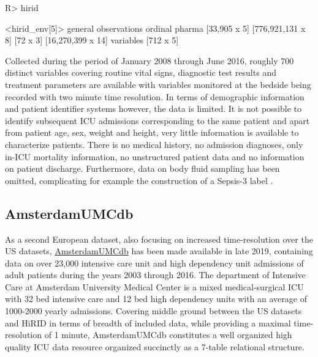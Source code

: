 \documentclass[
  notitle,
  nojss,
  noheadings]{jss}
\begin{document}
\begin{CodeChunk}
\begin{CodeInput}
R> hirid
\end{CodeInput}
\begin{CodeOutput}
<hirid_env[5]>
          general      observations           ordinal            pharma 
     [33,905 x 5] [776,921,131 x 8]          [72 x 3] [16,270,399 x 14] 
        variables 
        [712 x 5] 
\end{CodeOutput}
\end{CodeChunk}

Collected during the period of January 2008 through June 2016, roughly
700 distinct variables covering routine vital signs, diagnostic test
results and treatment parameters are available with variables monitored
at the bedside being recorded with two minute time resolution. In terms
of demographic information and patient identifier systems however, the
data is limited. It is not possible to identify subsequent ICU
admissions corresponding to the same patient and apart from patient age,
sex, weight and height, very little information is available to
characterize patients. There is no medical history, no admission
diagnoses, only in-ICU mortality information, no unstructured patient
data and no information on patient discharge. Furthermore, data on body
fluid sampling has been omitted, complicating for example the
construction of a Sepsis-3 label \citep{singer2016}.

\hypertarget{amsterdamumcdb}{%
\subsection{AmsterdamUMCdb}\label{amsterdamumcdb}}

As a second European dataset, also focusing on increased time-resolution
over the US datasets,
\href{https://amsterdammedicaldatascience.nl/\#amsterdamumcdb}{AmsterdamUMCdb}
has been made available in late 2019, containing data on over 23,000
intensive care unit and high dependency unit admissions of adult
patients during the years 2003 through 2016. The department of Intensive
Care at Amsterdam University Medical Center is a mixed medical-surgical
ICU with 32 bed intensive care and 12 bed high dependency units with an
average of 1000-2000 yearly admissions. Covering middle ground between
the US datasets and HiRID in terms of breadth of included data, while
providing a maximal time-resolution of 1 minute, AmsterdamUMCdb
constitutes a well organized high quality ICU data resource organized
succinctly as a 7-table relational structure.
\end{document}
